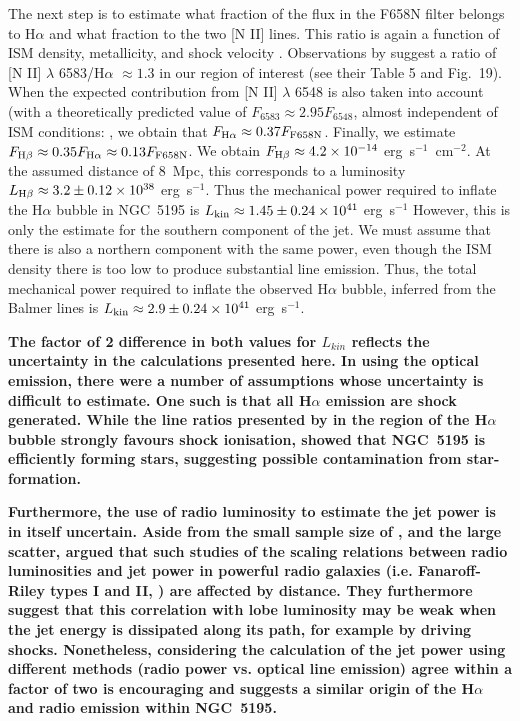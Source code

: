 \documentclass[fleqn,usenatbib]{mnras}
\begin{document}
The next step is to estimate what fraction of the flux in the F658N filter belongs to H$\alpha$ and 
what fraction to the two [N II] lines. This ratio is again a function of ISM density, metallicity, and 
shock velocity \citep{Allenetal2008}. Observations by \cite{Hoopes-Walterbos} suggest a ratio of [N II] 
$\lambda$ 6583/H$\alpha$ $\approx 1.3$ in our region of interest (see their Table 5 and Fig.~19). When 
the expected contribution from [N II] $\lambda$ 6548 is also taken into account (with a theoretically 
predicted value of $F_{6583} \approx 2.95 F_{6548}$, almost independent of ISM conditions: \citep{Allenetal2008}, we obtain that $F_{{\rm{H}}\alpha} \approx
0.37F_{\rm{F658N}}$. Finally, we estimate $F_{{\rm{H}}\beta} \approx 0.35F_{{\rm{H}}\alpha} \approx 
0.13F_{\rm{F658N}}$. We obtain $F_{{\rm{H}}\beta} \approx 4.2 \times 10^{-14}$ erg~s$^{-1}$~cm$^{-2}$. At the assumed distance of 8~Mpc, this corresponds to a luminosity $L_{\rm{H}\beta} \approx 3.2 \pm 0.12
\times 10^{38}$ erg~s$^{-1}$. Thus the mechanical power required to inflate the H$\alpha$ bubble in NGC~5195 is $L_{\rm kin} \approx 1.45 \pm 0.24 \times 10^{41}$ erg~s$^{-1}$
However, this is only the estimate for the southern component of the jet. 
We must assume that there is also a northern component with the same power, even though the ISM density 
there is too low to produce substantial line emission. Thus, the total mechanical power required to inflate the observed H$\alpha$ bubble, inferred from 
the Balmer lines is $L_{\rm kin} \approx 2.9 \pm 0.24 \times 10^{41}$ erg~s$^{-1}$. 

\textbf{The factor of 2 difference in both values for $L_{kin}$ reflects the uncertainty in the calculations 
presented here. In using the optical emission, there were a number of assumptions whose uncertainty is difficult to estimate. One such is that all H$\alpha$ emission are shock generated. While the line ratios presented by \cite{Hoopes-Walterbos} in the region of the H$\alpha$ bubble strongly favours shock ionisation, \cite{Alataloetal2016} showed that NGC~5195 is efficiently forming stars, suggesting possible contamination from star-formation.}

\textbf{Furthermore, the use of radio luminosity to estimate the jet power is in itself uncertain. Aside from the small sample size of \cite{MH07}, and the large scatter, \cite{GS2016} 
argued that such studies of the scaling relations between radio luminosities and jet power in 
powerful radio galaxies (i.e. Fanaroff-Riley types I and II, \citealt{FR74}) are affected by 
distance. They furthermore suggest that this correlation with lobe luminosity may
be weak when the jet energy is dissipated along its path, for example by driving shocks. Nonetheless, 
considering the calculation of the jet power using different methods (radio power vs. optical line 
emission) agree within a factor of two is encouraging and suggests a similar origin of the H$\alpha$ and 
radio emission within NGC~5195.}
\end{document}
